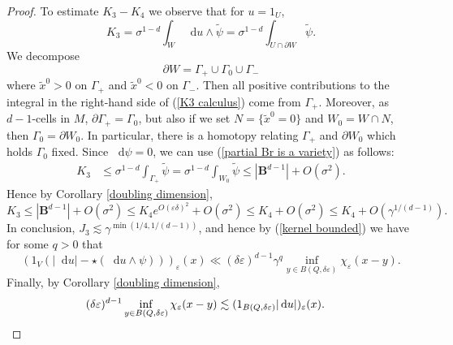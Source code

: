 \documentclass[reqno,10pt]{amsart}
\newcommand{\Ball}{\mathbf{B}}
\newcommand*\dif{\mathop{}\!\mathrm{d}}
\theoremstyle{definition}
\numberwithin{equation}{section}
\begin{document}
\begin{proof}
To estimate $K_3 - K_4$ we observe that for $u = 1_U$,
\begin{equation}\label{K3 calculus}
K_3 = \sigma^{1 - d} \int_W \dif u \wedge \tilde \psi = \sigma^{1 - d} \int_{U \cap \partial W} \tilde \psi.
\end{equation}
We decompose
$$\partial W = \Gamma_+ \cup \Gamma_0 \cup \Gamma_-$$
where $\tilde x^0 > 0$ on $\Gamma_+$ and $\tilde x^0 < 0$ on $\Gamma_-$. Then all positive contributions to the integral in the right-hand side of (\ref{K3 calculus}) come from $\Gamma_+$.
Moreover, as $d-1$-cells in $M$, $\partial \Gamma_+ = \Gamma_0$, but also if we set $N = \{\tilde x^0 = 0\}$ and $W_0 = W \cap N$, then $\Gamma_0 = \partial W_0$.
In particular, there is a homotopy relating $\Gamma_+$ and $\partial W_0$ which holds $\Gamma_0$ fixed.
Since $\dif \psi = 0$, we can use (\ref{partial Br is a variety}) as follows:
\begin{align*}
K_3 &\leq \sigma^{1 - d} \int_{\Gamma_+} \tilde \psi = \sigma^{1 - d} \int_{W_0} \tilde \psi \leq |\Ball^{d - 1}| + O(\sigma^2).
\end{align*}
Hence by Corollary \ref{doubling dimension},
$$K_3 \leq |\Ball^{d - 1}| + O(\sigma^2) \leq K_4 e^{O(\varepsilon\delta)^2} + O(\sigma^2) \leq K_4 + O(\sigma^2) \leq K_4 + O(\gamma^{1/(d - 1)}).$$
In conclusion, $J_3 \lesssim \gamma^{\min(1/4, 1/(d - 1))}$, and hence by (\ref{kernel bounded}) we have for some $q > 0$ that
$$(1_V(|\dif u| - \star(\dif u \wedge \psi)))_\varepsilon(x) \ll (\delta\varepsilon)^{d - 1} \gamma^q \inf_{y \in B(Q, \delta\varepsilon)} \chi_\varepsilon(x - y).$$
Finally, by Corollary \ref{doubling dimension},
\begin{align*}
(\delta\varepsilon)^{d - 1} \inf_{y \in B(Q, \delta\varepsilon)} \chi_\varepsilon(x - y) &\lesssim (1_{B(Q, \delta\varepsilon)} |\dif u|)_\varepsilon(x). \qedhere
\end{align*}
\end{proof}
\end{document}
